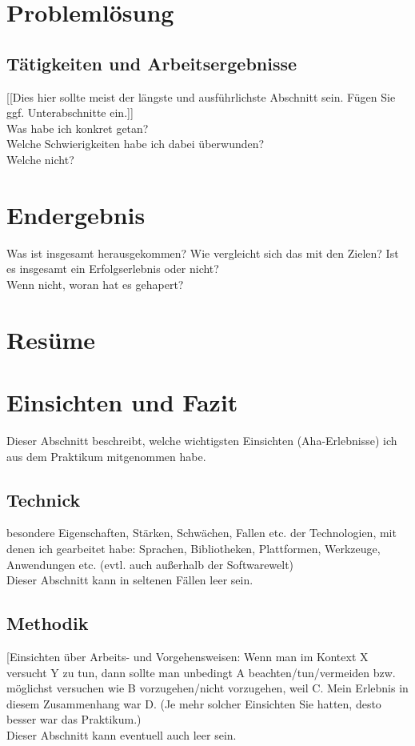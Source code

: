 \documentclass[pdftex,12pt,a4paper]{scrreprt}
\begin{document}
\section{Problemlösung}
\subsection{Tätigkeiten und Arbeitsergebnisse}
[[Dies hier sollte meist der längste und ausführlichste Abschnitt sein. Fügen Sie ggf.
Unterabschnitte ein.]]\\
Was habe ich konkret getan?\\
Welche Schwierigkeiten habe ich dabei überwunden?\\
Welche nicht?\\

\section{Endergebnis}
Was ist insgesamt herausgekommen?
Wie vergleicht sich das mit den Zielen? Ist es insgesamt ein Erfolgserlebnis oder nicht?\\
Wenn nicht, woran hat es gehapert?\\
\section{Resüme}
\section{Einsichten und Fazit}
Dieser Abschnitt beschreibt, welche wichtigsten Einsichten (Aha-Erlebnisse) ich aus dem
Praktikum mitgenommen habe.

\subsection{Technick}
besondere Eigenschaften, Stärken, Schwächen, Fallen etc. der Technologien, mit denen
ich gearbeitet habe: Sprachen, Bibliotheken, Plattformen, Werkzeuge, Anwendungen etc.
(evtl. auch außerhalb der Softwarewelt)\\
Dieser Abschnitt kann in seltenen Fällen leer sein.

\subsection{Methodik}
[Einsichten über Arbeits- und Vorgehensweisen: Wenn man im Kontext X versucht Y zu
tun, dann sollte man unbedingt A beachten/tun/vermeiden bzw. möglichst versuchen wie
B vorzugehen/nicht vorzugehen, weil C. Mein Erlebnis in diesem Zusammenhang war D.
(Je mehr solcher Einsichten Sie hatten, desto besser war das Praktikum.)\\
Dieser Abschnitt kann eventuell auch leer sein.
\end{document}
